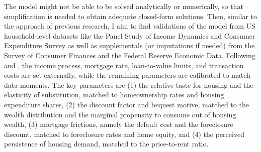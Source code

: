 \documentclass{style/fulbright}
\begin{document}
The model might not be able to be solved analytically or numerically, so that simplification is needed to obtain adequate closed-form solutions. Then, similar to the approach of previous research, I aim to find validations of the model from US household-level datasets like the Panel Study of Income Dynamics and Consumer Expenditure Survey as well as supplementals (or imputations if needed) from the Survey of Consumer Finances and the Federal Reserve Economic Data. Following  and , the income process, mortgage rate, loan-to-value limits, and transaction costs are set externally, while the remaining parameters are calibrated to match data moments. The key parameters are (1) the relative taste for housing and the elasticity of substitution, matched to homeownership rates and housing expenditure shares, (2) the discount factor and bequest motive, matched to the wealth distribution and the marginal propensity to consume out of housing wealth, (3) mortgage frictions, namely the default cost and the foreclosure discount, matched to foreclosure rates and home equity, and (4) the perceived persistence of housing demand, matched to the price-to-rent ratio.


\end{document}
